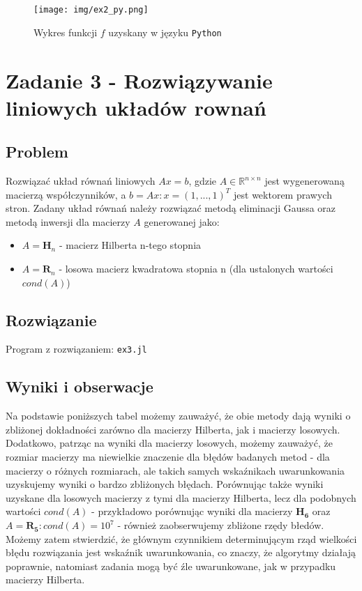 \documentclass[12pt]{article}
\begin{document}
        \begin{figure}[h!]
            \centering
            \texttt{[image: img/ex2\_py.png]}
            \caption{Wykres funkcji $f$ uzyskany w języku \texttt{Python}}
            \label{fig:ex2_jl}
        \end{figure}

\newpage

\section*{Zadanie 3 - Rozwiązywanie liniowych układów rownań}
    \subsection*{Problem}
        Rozwiązać układ równań liniowych $Ax = b$, gdzie $A \in \mathbb{R}^{n \times n}$ jest wygenerowaną macierzą współczynników, a $b = Ax : x = (1, ..., 1)^T$ jest wektorem prawych stron.
        \newline\newline
        Zadany układ równań należy rozwiązać metodą eliminacji Gaussa oraz metodą inwersji dla macierzy $A$ generowanej jako:
        \begin{itemize}
            \item $A = \mathbf{H}_n$ - macierz Hilberta n-tego stopnia
            \item $A = \mathbf{R}_n$ - losowa macierz kwadratowa stopnia n (dla ustalonych wartości $cond(A)$)
        \end{itemize}

    \subsection*{Rozwiązanie}
        Program z rozwiązaniem: \texttt{ex3.jl}

    \subsection*{Wyniki i obserwacje}
        Na podstawie poniższych tabel możemy zauważyć, że obie metody dają wyniki o zbliżonej dokładności zarówno dla macierzy Hilberta, jak i macierzy losowych.
        \newline
        Dodatkowo, patrząc na wyniki dla macierzy losowych, możemy zauważyć, że rozmiar macierzy ma niewielkie znaczenie dla błędów badanych metod - dla macierzy o różnych rozmiarach, ale takich samych wskaźnikach uwarunkowania uzyskujemy wyniki o bardzo zbliżonych błędach.
        \newline
        Porównując także wyniki uzyskane dla losowych macierzy z tymi dla macierzy Hilberta, lecz dla podobnych wartości $cond(A)$ - przykładowo porównując wyniki dla macierzy $\mathbf{H_6}$ oraz $A = \mathbf{R_5} : cond(A) = 10^7$ -  również zaobserwujemy zbliżone rzędy błedów.
        \newline
        Możemy zatem stwierdzić, że głównym czynnikiem determinującym rząd wielkości błędu rozwiązania jest wskaźnik uwarunkowania, co znaczy, że algorytmy działają poprawnie, natomiast zadania mogą być źle uwarunkowane, jak w przypadku macierzy Hilberta.
        \newline
\end{document}
